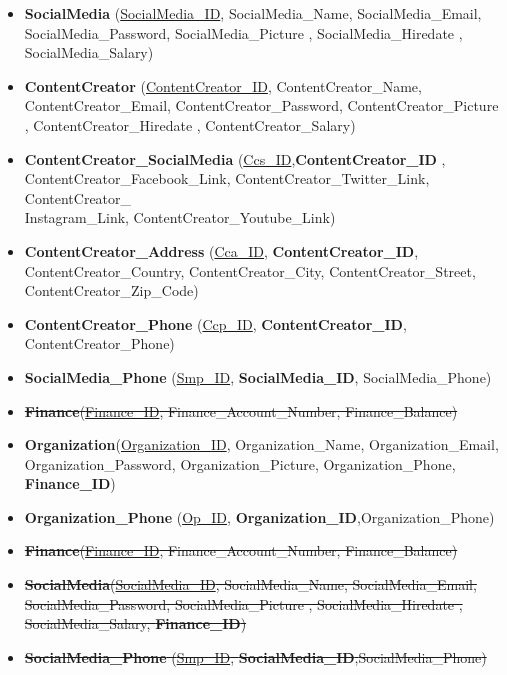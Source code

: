 \begin{itemize}
    \item \textbf{SocialMedia} (\underline{SocialMedia\_ID}, SocialMedia\_Name, SocialMedia\_Email, SocialMedia\_Password, SocialMedia\_Picture , SocialMedia\_Hiredate , SocialMedia\_Salary)
    \item \textbf{ContentCreator} (\underline{ContentCreator\_ID}, ContentCreator\_Name, ContentCreator\_Email, ContentCreator\_Password, ContentCreator\_Picture , ContentCreator\_Hiredate , ContentCreator\_Salary)
    \item \textbf{ContentCreator\_SocialMedia} (\underline{Ccs\_ID},\textbf{ContentCreator\_ID} , ContentCreator\_Facebook\_Link, ContentCreator\_Twitter\_Link, ContentCreator\_\\Instagram\_Link, ContentCreator\_Youtube\_Link)
    \item \textbf{ContentCreator\_Address} (\underline{Cca\_ID}, \textbf{ContentCreator\_ID}, ContentCreator\_Country, ContentCreator\_City, ContentCreator\_Street, ContentCreator\_Zip\_Code)
    \item \textbf{ContentCreator\_Phone} (\underline{Ccp\_ID}, \textbf{ContentCreator\_ID}, ContentCreator\_Phone)
    \item \textbf{SocialMedia\_Phone} (\underline{Smp\_ID}, \textbf{SocialMedia\_ID}, SocialMedia\_Phone)

    \item \sout{\textbf{Finance}(\underline{Finance\_ID}, Finance\_Account\_Number, Finance\_Balance)}
    \item \textbf{Organization}(\underline{Organization\_ID}, Organization\_Name, Organization\_Email, Organization\_Password, Organization\_Picture, Organization\_Phone, \textbf{Finance\_ID})
    \item \textbf{Organization\_Phone} (\underline{Op\_ID}, \textbf{Organization\_ID},{Organization\_Phone})


    \item \sout{\textbf{Finance}(\underline{Finance\_ID}, Finance\_Account\_Number, Finance\_Balance)}
    \item \sout{\textbf{SocialMedia}(\underline{SocialMedia\_ID}, SocialMedia\_Name, SocialMedia\_Email, SocialMedia\_Password, SocialMedia\_Picture ,  SocialMedia\_Hiredate , SocialMedia\_Salary, \textbf{Finance\_ID})}
    \item \sout{\textbf{SocialMedia\_Phone} (\underline{Smp\_ID}, \textbf{SocialMedia\_ID},{SocialMedia\_Phone})}




\end{itemize}
